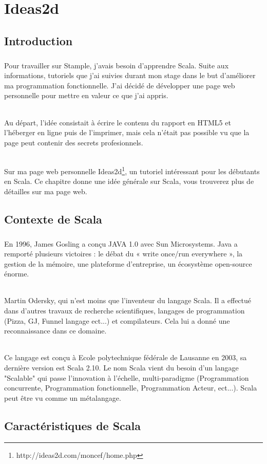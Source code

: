 \chapter{Ideas2d}
\section{Introduction}
\paragraph{}
Pour travailler sur Stample, j'avais besoin d'apprendre Scala.
Suite aux informations, tutoriels que j'ai suivies durant mon stage dans le but d'améliorer ma programmation  fonctionnelle. J'ai décidé de développer une page web personnelle pour mettre en valeur ce que j'ai appris.
\subparagraph{}
Au départ, l'idée consistait à écrire le contenu du rapport en HTML5 et l'héberger en ligne puis de l'imprimer, mais cela n'était pas possible vu que la page peut contenir des secrets profesionnels. 
\subparagraph{}
Sur ma page web personnelle Ideas2d\footnote{http://ideas2d.com/moncef/home.php}, un tutoriel intéressant pour les débutants en Scala.
Ce chapitre donne une idée générale sur Scala, vous trouverez plus de détailles sur ma page web.
\section{Contexte de Scala}
\paragraph{}
En 1996, James Gosling a conçu JAVA 1.0 avec Sun Microsystems.
Java a remporté plusieurs victoires : le débat du « write once/run everywhere », la gestion de la mémoire, une plateforme d'entreprise, un écosystème open-source énorme.
\subparagraph{}
Martin Odersky, qui n'est moins que l'inventeur du langage Scala. Il a effectué dans d'autres travaux de recherche scientifiques, langages de programmation (Pizza, GJ, Funnel langage ect...) et compilateurs. Cela lui a donné une reconnaissance dans ce domaine.
\subparagraph{}
Ce langage est conçu à  Ecole polytechnique fédérale de Lausanne en 2003, sa dernière version est Scala 2.10.\newline
Le nom Scala vient du besoin d'un langage "Scalable" qui passe l'innovation à l'échelle, multi-paradigme (Programmation concurrente, Programmation fonctionnelle, Programmation Acteur, ect...). Scala peut être vu comme un métalangage.
\section{Caractéristiques de Scala}
